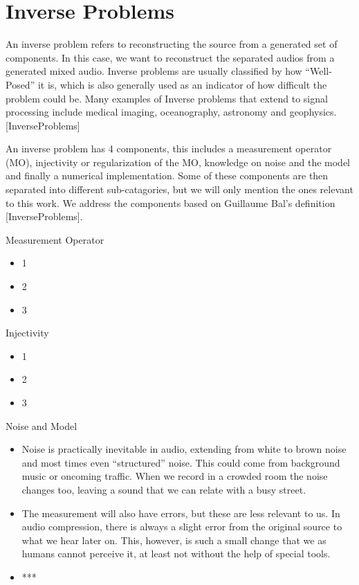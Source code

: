 \documentclass{book}
\begin{document}
\section{Inverse Problems}
\qquad An inverse problem refers to reconstructing the source from a generated set of components. In this case, we want to reconstruct the separated audios from a generated mixed audio. Inverse problems are usually classified by how “Well-Posed” it is, which is also generally used as an indicator of how difficult the problem could be. Many examples of Inverse problems that extend to signal processing include medical imaging, oceanography, astronomy and geophysics. [InverseProblems]
\par
An inverse problem has 4 components, this includes a measurement operator (MO), injectivity or regularization of the MO, knowledge on noise and the model and finally a numerical implementation. Some of these components are then separated into different sub-catagories, but we will only mention the ones relevant to this work. We address the components based on Guillaume Bal’s definition [InverseProblems].

\begin{center}
\noindent Measurement Operator
\end{center}
\begin{itemize}
    \item 1
    \item 2
    \item 3
\end{itemize}

\begin{center}
\noindent Injectivity
\end{center}
\begin{itemize}
    \item 1
    \item 2
    \item 3
\end{itemize}

\begin{center}
    \noindent Noise and Model
\end{center}
\begin{itemize}
    \item Noise is practically inevitable in audio, extending from white to brown noise and most times even “structured” noise. This could come from background music or oncoming traffic. When we record in a crowded room the noise changes too, leaving a sound that we can relate with a busy street.

    \item The measurement will also have errors, but these are less relevant to us. In audio compression, there is always a slight error from the original source to what we hear later on. This, however, is such a small change that we as humans cannot perceive it, at least not without the help of special tools.

    \item ***
\end{itemize}
    
\end{document}

